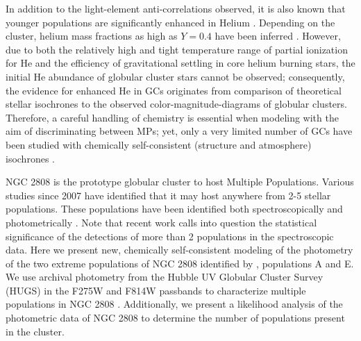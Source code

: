 In addition to the light-element anti-correlations observed, it is also known
that younger populations are significantly enhanced in Helium
\citep{Piotto2007, Piotto2015, Latour2019}. Depending on the cluster, helium
mass fractions as high as $Y=0.4$ have been inferred \citep[e.g][]{Milone2015}.
However, due to both the relatively high and tight temperature range of partial
ionization for He and the efficiency of gravitational settling in core helium
burning stars, the initial He abundance of globular cluster stars cannot be
observed; consequently, the evidence for enhanced He in GCs originates from
comparison of theoretical stellar isochrones to the observed
color-magnitude-diagrams of globular clusters. Therefore, a careful handling of
chemistry is essential when modeling with the aim of discriminating between
MPs; yet, only a very limited number of GCs have been studied with
chemically self-consistent (structure and atmosphere) isochrones
\citep[e.g.][NGC 6752]{Dotter2015}. 


NGC 2808 is the prototype globular cluster to host Multiple Populations.
Various studies since 2007 have identified that it may host anywhere from 2-5
stellar populations. These populations have been identified both
spectroscopically \citep[i.e.][]{Carretta2004, Carretta2006, Carretta2010, Gratton2011, Carretta2015, Hong2021} and photometrically \citep[i.e.][]{Piotto2007, Piotto2015, Milone2015, Milone2017, Pasquato2019}. Note
that recent work \citep{Valle2022} calls into question the statistical
significance of the detections of more than 2 populations in the spectroscopic
data. Here we present new, chemically self-consistent modeling of the
photometry of the two extreme populations of NGC 2808 identified by
\citet{Milone2015}, populations A and E. We use archival photometry from the
Hubble UV Globular Cluster Survey (HUGS) \citep{Piotto2015, Milone2017} in the
F275W and F814W passbands to characterize multiple populations in NGC 2808
\citep{Milone2015, Milone2015b}. Additionally, we present a likelihood analysis of the
photometric data of NGC 2808 to determine the number of populations present in
the cluster.


